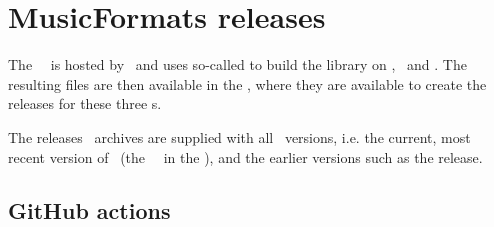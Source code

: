 



\chapter{MusicFormats releases}\label{MusicFormats releases}

%
%
%
%
%
%
%
%
%
%
%


The \mf\ \repo\ is hosted by \github\ and uses so-called  to build the library on \MacOS, \Ubuntu\ and \Windows. The resulting files are then available in the \repo, where they are available to create the releases for these three \OS s.

The releases \zip\ archives are supplied with all \mf\ versions, i.e. the current, most recent version of \mf\ (the \ \masterBranch\ in the \repo), and the earlier versions such as the  release.


\section{GitHub actions}

